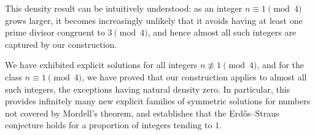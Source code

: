 \documentclass[12pt]{article}
\begin{document}
This density result can be intuitively understood: as an integer \(n \equiv 1 \pmod{4}\) grows larger, it becomes increasingly unlikely that it avoids having at least one prime divisor congruent to \(3 \pmod{4}\), and hence almost all such integers are captured by our construction.
\vspace{0.3cm}

We have exhibited explicit solutions for all integers \(n \not\equiv 1 \pmod{4}\), 
and for the class \(n \equiv 1 \pmod{4}\), we have proved that our construction 
applies to almost all such integers, the exceptions having natural density zero. 
In particular, this provides infinitely many new explicit families of symmetric 
solutions for numbers not covered by Mordell's theorem, and establishes that 
the Erdős--Straus conjecture holds for a proportion of integers tending to \(1\).
\end{document}
